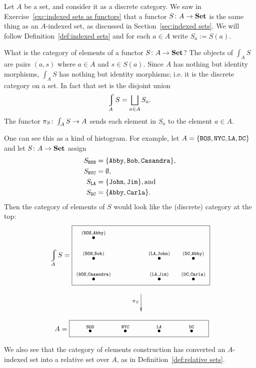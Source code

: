 \documentclass[CT4S-EN-RU]{subfiles}
\begin{document}
\begin{exampleENG}
Let $A$ be a set, and consider it as a discrete category. We saw in Exercise~\ref{exc:indexed sets as functors} that a functor $S\colon A\rightarrow{\mathbf{Set}}$ is the same thing as an $A$-indexed set, as discussed in Section~\ref{sec:indexed sets}. We will follow Definition~\ref{def:indexed sets} and for each $a\in A$ write $S_a:=S(a)$.

What is the category of elements of a functor $S\colon A\rightarrow{\mathbf{Set}}$? The objects of $\int_AS$ are pairs $(a,s)$ where $a\in A$ and $s\in S(a)$. Since $A$ has nothing but identity morphisms, $\int_AS$ has nothing but identity morphisms; i.e. it is the discrete category on a set. In fact that set is the disjoint union $$\varint_AS=\bigsqcup_{a\in A}S_a.$$ The functor $\pi_S\colon\int_AS\rightarrow A$ sends each element in $S_a$ to the element $a\in A$. 

One can see this as a kind of histogram. For example, let $A=\{{\tt BOS, NYC, LA, DC}\}$ and let $S\colon A\rightarrow{\mathbf{Set}}$ assign 
\begin{align*}
S_{{\tt BOS}}&=\{{\tt Abby, Bob, Casandra}\},\\
S_{\tt NYC}&=\emptyset,\\
S_{\tt LA}&=\{{\tt John, Jim}\}, \textnormal{and}\\
S_{\tt DC}&=\{{\tt Abby,Carla}\}.
\end{align*}
Then the category of elements of $S$ would look like the (discrete) category at the top: 
\begin{align}\label{dia:elements for cities}
\varint_AS=\parbox{2.7in}{\fbox{\xymatrix@=10pt{
\LTO{(BOS,Abby)}\\
\LTO{(BOS,Bob)}&\hspace{.3in}&\LTO{(LA,John)}&\LTO{(DC,Abby)}\\
\LTO{(BOS,Casandra)}&&\LTO{(LA,Jim)}&\LTO{(DC,Carla)}
}}}
\end{align}
$$
\hsp\xymatrix{~\ar[d]_{\pi_S}\\~}
$$
$$
\;\;A=\fbox{\xymatrix@=33pt{\hspace{.25in}\LTO{BOS}&\LTO{NYC}&\LTO{LA}&\LTO{DC}\hspace{.2in}}}
$$

We also see that the category of elements construction has converted an $A$-indexed set into a relative set over $A$, as in Definition~\ref{def:relative sets}.
\end{exampleENG}

\begin{exampleRUS}
\end{exampleRUS}
\end{document}
